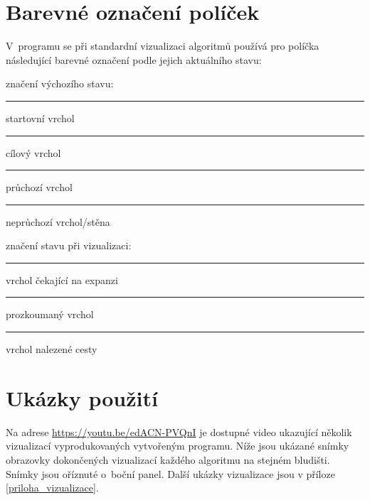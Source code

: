 \documentclass[12pt]{report}			%
\begin{document}
			\section{Barevné označení políček}
			V~programu se při standardní vizualizaci algoritmů používá pro políčka následující barevné označení podle jejich aktuálního stavu: \\[1ex]
			
			\newcommand\ColorSquare[1]{{\color{#1}\rule{4mm}{4mm}}}			
			
			\begin{minipage}[outer sep=0]{\textwidth}
\begin{minipage}[t]{0.48\textwidth}
značení výchozího stavu:\\
\ColorSquare{start_colour} \quad startovní vrchol \\
			\ColorSquare{finish_colour} \quad cílový vrchol \\
			\ColorSquare{empty_colour} \quad průchozí vrchol\\
			\ColorSquare{wall_colour} \quad neprůchozí vrchol/stěna \\
    \end{minipage}\hfill
    \begin{minipage}[t]{0.48\textwidth}
    značení stavu při vizualizaci:\\
    \ColorSquare{in_frontier_colour} \quad vrchol čekající na expanzi\\ %
			\ColorSquare{visited_colour} \quad prozkoumaný vrchol\\	
			\ColorSquare{path_colour} \quad vrchol nalezené cesty
    \end{minipage}
    \end{minipage}\vspace{1ex}
						

			
			\section{Ukázky použití}
			Na adrese \url{https://youtu.be/edACN-PVQnI} je dostupné video ukazující několik vizualizací vyprodukovaných vytvořeným programu. Níže jsou ukázané snímky obrazovky dokončených vizualizací každého algoritmu na stejném bludišti. Snímky jsou oříznuté o~boční panel. Další ukázky vizualizace jsou v příloze \ref{priloha_vizualizace}.
			
\end{document}
